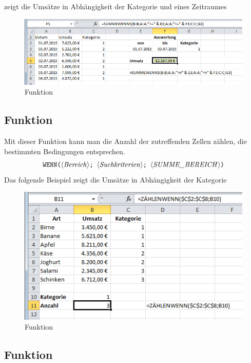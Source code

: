  zeigt die Umsätze in Abhängigkeit der Kategorie und eines Zeitraumes%
	\begin{figure}[H]
		\centering
			\includegraphics[scale=0.7]{images/summewenns}
		\caption{ Funktion}
		\label{fig:summewenns}
	\end{figure}



\subsection{ Funktion}

Mit dieser Funktion kann man die Anzahl der zutreffenden Zellen zählen, die bestimmten Bedingungen entsprechen.%
$$ \text{\stmt{WENN(\syntax{Bereich}; \syntax{Suchkriterien}; \syntax{SUMME\_BEREICH})}}$$%
%
Das folgende Beispiel zeigt die Umsätze in Abhängigkeit der Kategorie%
	\begin{figure}[H]
		\centering
			\includegraphics[scale=0.7]{images/zaehlenwenn}
		\caption{ Funktion}
		\label{fig:zaehlenwenn}
	\end{figure}

\subsection{ Funktion}

